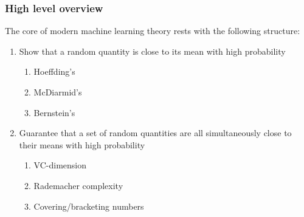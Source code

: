 \documentclass[12pt]{beamer}
\date{}
\begin{document}
\title{}
\subtitle{\classTitle}

\begin{frame}
\maketitle
%
\organization
%
\end{frame}


\begin{frame}[fragile]
\frametitle{High level overview}
The core of modern machine learning theory rests with the following structure:

\vsp
\begin{enumerate}
\item {} Show that a random quantity is close to its mean with 
high probability
\begin{enumerate}
\item Hoeffding's
\item McDiarmid's
\item Bernstein's
\end{enumerate}
\item {} Guarantee that a set of random quantities are all simultaneously close 
to their means with high probability
\begin{enumerate}
\item VC-dimension
\item Rademacher complexity
\item Covering/bracketing numbers
\end{enumerate}

\end{enumerate}
\end{frame}
%
\end{document}
